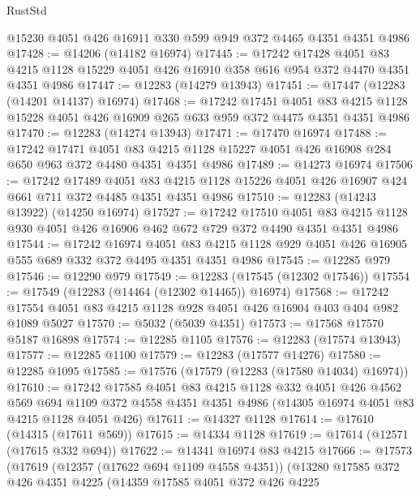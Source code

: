 \begin{lexlean}{RustStd}
\begin{coremodule}
    @15230
    @4051
    @426
    @16911
    @330
    @599
    @949
    @372
    @4465
    @4351
    @4351
    @4986
@17428 := @14206 (@14182 @16974)
@17445 := @17242
    @17428
    @4051
    @83
    @4215
    @1128
    @15229
    @4051
    @426
    @16910
    @358
    @616
    @954
    @372
    @4470
    @4351
    @4351
    @4986
@17447 := @12283 (@14279 @13943)
@17451 := @17447 (@12283 (@14201 @14137) @16974)
@17468 := @17242
    @17451
    @4051
    @83
    @4215
    @1128
    @15228
    @4051
    @426
    @16909
    @265
    @633
    @959
    @372
    @4475
    @4351
    @4351
    @4986
@17470 := @12283 (@14274 @13943)
@17471 := @17470 @16974
@17488 := @17242
    @17471
    @4051
    @83
    @4215
    @1128
    @15227
    @4051
    @426
    @16908
    @284
    @650
    @963
    @372
    @4480
    @4351
    @4351
    @4986
@17489 := @14273 @16974
@17506 := @17242
    @17489
    @4051
    @83
    @4215
    @1128
    @15226
    @4051
    @426
    @16907
    @424
    @661
    @711
    @372
    @4485
    @4351
    @4351
    @4986
@17510 := @12283 (@14243 @13922) (@14250 @16974)
@17527 := @17242
    @17510
    @4051
    @83
    @4215
    @1128
    @930
    @4051
    @426
    @16906
    @462
    @672
    @729
    @372
    @4490
    @4351
    @4351
    @4986
@17544 := @17242
    @16974
    @4051
    @83
    @4215
    @1128
    @929
    @4051
    @426
    @16905
    @555
    @689
    @332
    @372
    @4495
    @4351
    @4351
    @4986
@17545 := @12285 @979
@17546 := @12290 @979
@17549 := @12283 (@17545 (@12302 @17546))
@17554 := @17549 (@12283 (@14464 (@12302 @14465)) @16974)
@17568 := @17242 @17554 @4051 @83 @4215 @1128 @928 @4051 @426 @16904 @403 @404 @982 @1089 @5027
@17570 := @5032 (@5039 @4351)
@17573 := @17568 @17570 @5187 @16898
@17574 := @12285 @1105
@17576 := @12283 (@17574 @13943)
@17577 := @12285 @1100
@17579 := @12283 (@17577 @14276)
@17580 := @12285 @1095
@17585 := @17576 (@17579 (@12283 (@17580 @14034) @16974))
@17610 := @17242
    @17585
    @4051
    @83
    @4215
    @1128
    @332
    @4051
    @426
    @4562
    @569
    @694
    @1109
    @372
    @4558
    @4351
    @4351
    @4986
    (@14305 @16974 @4051 @83 @4215 @1128 @4051 @426)
@17611 := @14327 @1128
@17614 := @17610 (@14315 (@17611 @569))
@17615 := @14334 @1128
@17619 := @17614 (@12571 (@17615 @332 @694))
@17622 := @14341 @16974 @83 @4215
@17666 := @17573
    (@17619
      (@12357 (@17622 @694 @1109 @4558 @4351))
      (@13280
        @17585
        @372
        @426
        @4351
        @4225
        (@14359
          @17585
          @4051
          @372
          @426
          @4225

\end{coremodule}
\end{lexlean}
